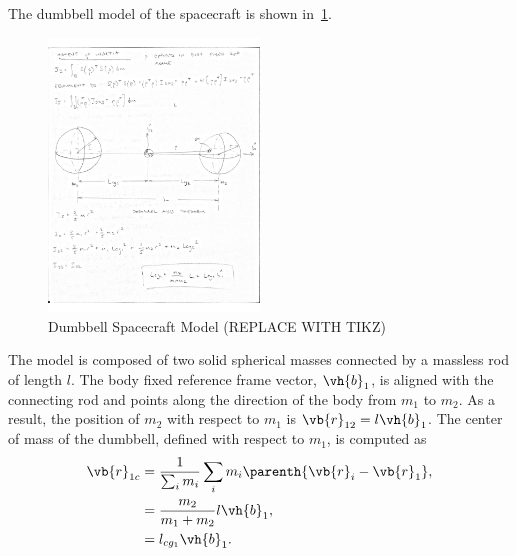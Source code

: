 \documentclass[11pt, reqno]{article}    %
\begin{document}
The dumbbell model of the spacecraft is shown in~\cref{fig:dumbbell_sc}.
\begin{figure}
    \centering
    \includegraphics[width=0.5\textwidth]{figures/dumbbell_model.pdf}
    \caption{Dumbbell Spacecraft Model (REPLACE WITH TIKZ)\label{fig:dumbbell_sc}}
\end{figure}
The model is composed of two solid spherical masses connected by a massless rod of length \( l\). 
The body fixed reference frame vector, \( \vh{b}_1\), is aligned with the connecting rod and points along the direction of the body from \( m_1 \) to \( m_2\).
As a result, the position of \( m_2 \) with respect to \( m_1\) is \( \vb{r}_{12} = l \vh{b}_1\).
The center of mass of the dumbbell, defined with respect to \( m_1\), is computed as
\begin{align}\label{eqn:com}
    \vb{r}_{1c} &= \frac{1}{\sum_i m_i} \sum_i m_i \parenth{\vb{r}_i - \vb{r}_1},\\
    &= \frac{m_2}{m_1+m_2} l \vh{b}_1 , \\
    &= l_{cg_{1}} \vh{b}_1 .
\end{align}
\end{document}
